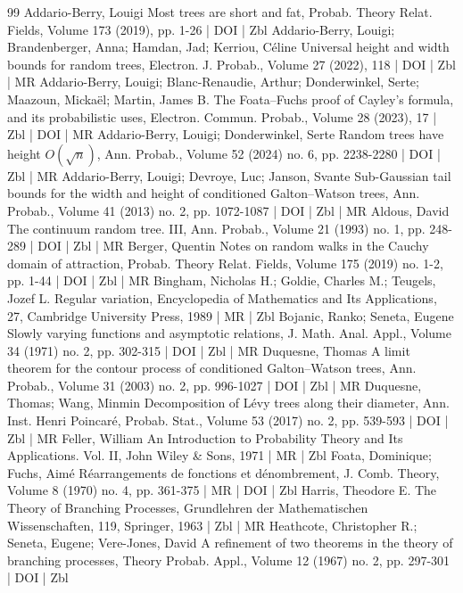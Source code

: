 \documentclass[10pt]{amsart}
\theoremstyle{definition}\newtheorem{defi}[theo]{Definition}\newtheorem{rema}[theo]{Remark}\newtheorem{exam}[theo]{Example}\newtheorem{exem}[theo]{Example}\newtheorem{nota}[theo]{Notation}
\begin{document}
\begin{thebibliography}{99}
Addario-Berry, Louigi Most trees are short and fat, Probab. Theory Relat. Fields, Volume 173 (2019), pp. 1-26 | DOI | Zbl
Addario-Berry, Louigi; Brandenberger, Anna; Hamdan, Jad; Kerriou, Céline Universal height and width bounds for random trees, Electron. J. Probab., Volume 27 (2022), 118 | DOI | Zbl | MR
Addario-Berry, Louigi; Blanc-Renaudie, Arthur; Donderwinkel, Serte; Maazoun, Mickaël; Martin, James B. The Foata–Fuchs proof of Cayley’s formula, and its probabilistic uses, Electron. Commun. Probab., Volume 28 (2023), 17 | Zbl | DOI | MR
Addario-Berry, Louigi; Donderwinkel, Serte Random trees have height ${O}(\sqrt{n})$, Ann. Probab., Volume 52 (2024) no. 6, pp. 2238-2280 | DOI | Zbl | MR
Addario-Berry, Louigi; Devroye, Luc; Janson, Svante Sub-Gaussian tail bounds for the width and height of conditioned Galton–Watson trees, Ann. Probab., Volume 41 (2013) no. 2, pp. 1072-1087 | DOI | Zbl | MR
Aldous, David The continuum random tree. III, Ann. Probab., Volume 21 (1993) no. 1, pp. 248-289 | DOI | Zbl | MR
Berger, Quentin Notes on random walks in the Cauchy domain of attraction, Probab. Theory Relat. Fields, Volume 175 (2019) no. 1-2, pp. 1-44 | DOI | Zbl | MR
Bingham, Nicholas H.; Goldie, Charles M.; Teugels, Jozef L. Regular variation, Encyclopedia of Mathematics and Its Applications, 27, Cambridge University Press, 1989 | MR | Zbl
Bojanic, Ranko; Seneta, Eugene Slowly varying functions and asymptotic relations, J. Math. Anal. Appl., Volume 34 (1971) no. 2, pp. 302-315 | DOI | Zbl | MR
Duquesne, Thomas A limit theorem for the contour process of conditioned Galton–Watson trees, Ann. Probab., Volume 31 (2003) no. 2, pp. 996-1027 | DOI | Zbl | MR
Duquesne, Thomas; Wang, Minmin Decomposition of Lévy trees along their diameter, Ann. Inst. Henri Poincaré, Probab. Stat., Volume 53 (2017) no. 2, pp. 539-593 | DOI | Zbl | MR
Feller, William An Introduction to Probability Theory and Its Applications. Vol. II, John Wiley \& Sons, 1971 | MR | Zbl
Foata, Dominique; Fuchs, Aimé Réarrangements de fonctions et dénombrement, J. Comb. Theory, Volume 8 (1970) no. 4, pp. 361-375 | MR | DOI | Zbl
Harris, Theodore E. The Theory of Branching Processes, Grundlehren der Mathematischen Wissenschaften, 119, Springer, 1963 | Zbl | MR
Heathcote, Christopher R.; Seneta, Eugene; Vere-Jones, David A refinement of two theorems in the theory of branching processes, Theory Probab. Appl., Volume 12 (1967) no. 2, pp. 297-301 | DOI | Zbl

\end{thebibliography}
\end{document}
